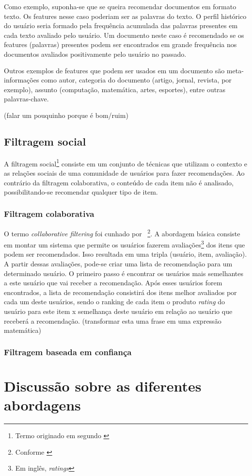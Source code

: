 Como exemplo, suponha-se que se queira recomendar documentos em formato texto. Os features nesse caso poderiam ser as palavras do texto. O perfil histórico do usuário seria formado pela frequência acumulada das palavras presentes em cada texto avaliado pelo usuário. Um documento neste caso é recomendado se os features (palavras) presentes podem ser encontrados em grande frequência nos documentos avaliados positivamente pelo usuário no passado.

Outros exemplos de features que podem ser usados em um documento são meta-informações como autor, categoria do documento (artigo, jornal, revista, por exemplo), assunto (computação, matemática, artes, esportes), entre outras palavras-chave.

(falar um pouquinho porque é bom/ruim)

\subsection{Filtragem social} %


A filtragem social\footnote{Termo originado em \cite{Malone87} segundo \cite{Hill95}} consiste em um conjunto de técnicas que utilizam o contexto e as relações sociais de uma comunidade de usuários para fazer recomendações. Ao contrário da filtragem colaborativa, o conteúdo de cada item não é analisado, possibilitando-se recomendar qualquer tipo de item.

\subsubsection{Filtragem colaborativa}

O termo \textit{collaborative filtering} foi cunhado por \cite{Goldberg92}~\footnote{Conforme \cite{Resnick97}}. A abordagem básica consiste em montar um sistema que permite os usuários fazerem avaliações\footnote{Em inglês, \textit{ratings}} dos itens que podem ser recomendados. Isso resultada em uma tripla (usuário, item, avaliação). A partir dessas avaliações, pode-se criar uma lista de recomendação para um determinado usuário. O primeiro passo é encontrar os usuários mais semelhantes a este usuário que vai receber a recomendação. Após esses usuários forem encontrados, a lista de recomendação consistirá dos itens melhor avaliados por cada um deste usuários, sendo o ranking de cada item o produto \textit{rating} do usuário para este item x semelhança deste usuário em relação ao usuário que receberá a recomendação. (transformar esta uma frase em uma expressão matemática)



\subsubsection{Filtragem baseada em confiança} %

\section{Discussão sobre as diferentes abordagens}

